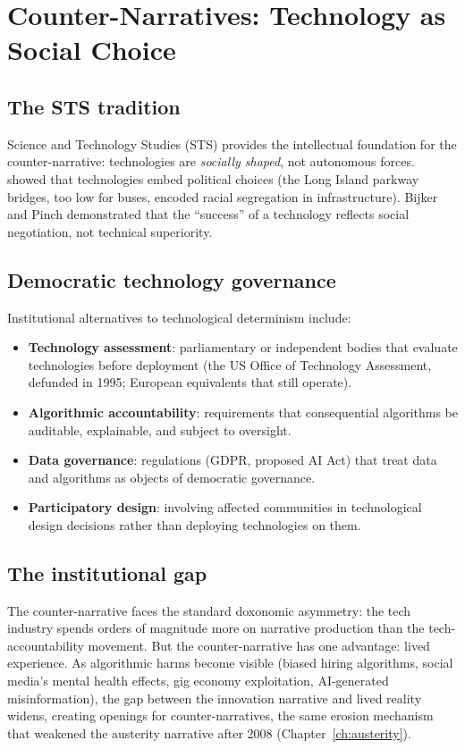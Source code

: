 \section{Counter-Narratives: Technology as Social Choice}
\label{sec:ch28-counter}

\subsection{The STS tradition}

Science and Technology Studies (STS) provides the intellectual foundation for the counter-narrative: technologies are \emph{socially shaped}, not autonomous forces.
\textcite{winner1986} showed that technologies embed political choices (the Long Island parkway bridges, too low for buses, encoded racial segregation in infrastructure).
Bijker and Pinch demonstrated that the ``success'' of a technology reflects social negotiation, not technical superiority.

\subsection{Democratic technology governance}

Institutional alternatives to technological determinism include:
\begin{itemize}[nosep]
  \item \textbf{Technology assessment}: parliamentary or independent bodies that evaluate technologies before deployment (the US Office of Technology Assessment, defunded in 1995; European equivalents that still operate).
  \item \textbf{Algorithmic accountability}: requirements that consequential algorithms be auditable, explainable, and subject to oversight.
  \item \textbf{Data governance}: regulations (GDPR, proposed AI Act) that treat data and algorithms as objects of democratic governance.
  \item \textbf{Participatory design}: involving affected communities in technological design decisions rather than deploying technologies on them.
\end{itemize}

\subsection{The institutional gap}

The counter-narrative faces the standard doxonomic asymmetry: the tech industry spends orders of magnitude more on narrative production than the tech-accountability movement.
But the counter-narrative has one advantage: lived experience.
As algorithmic harms become visible (biased hiring algorithms, social media's mental health effects, gig economy exploitation, AI-generated misinformation), the gap between the innovation narrative and lived reality widens, creating openings for counter-narratives, the same erosion mechanism that weakened the austerity narrative after 2008 (Chapter~\ref{ch:austerity}).

